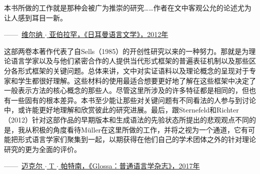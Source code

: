 {\smallskip

\noindent
本书所做的工作就是那种会被广为推崇的研究……作者在文中客观公允的论述尤为让人感到耳目一新。
 \begin{flushright}
——\, \href{http://dx.doi.org/10.1515/germ-2011-537}{维尔纳 $\cdot$ 亚伯拉罕，《日耳曼语言文学》，2012年}
\end{flushright}

\smallskip

\noindent
这部两卷本著作代表了自Sells（1985）的开创性研究以来的一种努力。那就是为理论语言学家以及与他们紧密合作的人提供当代形式框架的普遍表征机制以及那些区分各形式框架的关键问题。总体来讲，文中对实证语料以及理论概念的呈现对于专家和学生都很好理解。这些材料的使用最适合想要更好地了解在这些框架中决定了一般表示方法的核心概念的那些人。尽管这里所涉及的许多特征都是相同的，但也有一些固有的根本差异。本书至少能让那些对关键问题有不同看法的人参与到讨论中，或许能更好地理解和欣赏彼此的研究进展。最后，跟Sternefeld和Richter（2012）针对这部作品的早期版本和生成语法的先验状态所提出的悲观观点不同的是，我从积极的角度看待Müller在这里所做的工作，并将之视为一个通道，它有可能把形式语言学家们聚集到一起，以期获得在他们自己的学术团体之外的针对理论研究的更为全面的评价。
\begin{flushright}
——\, \href{http://doi.org/10.5334/gjgl.414}{迈克尔 $\cdot$ T $\cdot$  帕特南，《Glossa：普通语言学杂志》，2017年}
\end{flushright}


}
